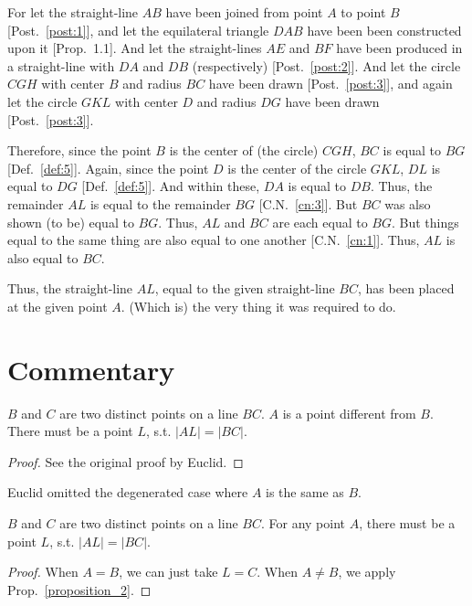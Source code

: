 For let the straight-line $AB$ have been joined from point $A$ to point $B$ [Post.~\ref{post:1}], and let the
equilateral triangle $DAB$ have been been constructed upon it [Prop.~1.1].  And let the
straight-lines $AE$ and $BF$ have been produced in a straight-line with $DA$ and $DB$  (respectively) [Post.~\ref{post:2}].
And let the circle $CGH$ with center $B$ and radius $BC$ have been drawn
[Post.~\ref{post:3}], and again let the circle $GKL$ with center $D$ and radius $DG$ have been drawn [Post.~\ref{post:3}].

Therefore, since the point $B$ is the center of (the circle) $CGH$, $BC$ is equal to 
$BG$ [Def.~\ref{def:5}]. Again, since the point $D$ is the center of the circle $GKL$, $DL$ is equal to $DG$ [Def.~\ref{def:5}]. And within these,  $DA$ is equal to $DB$. Thus, the remainder $AL$ is equal to the remainder $BG$ [C.N.~\ref{cn:3}]. But $BC$ was also shown (to be)  equal to $BG$. Thus,  $AL$
and $BC$ are each equal to $BG$. But things equal to the same thing are also equal to one another [C.N.~\ref{cn:1}]. Thus, $AL$ is also equal to $BC$.

Thus, the straight-line $AL$, equal to the given straight-line $BC$,
has been placed at the given point $A$. (Which is) the very thing it was required to do.

\section*{Commentary}

\begin{proposition}\label{proposition_2}\leanok
    $B$ and $C$ are two distinct points on a line $BC$. $A$ is a point different from $B$. There must be a point $L$, s.t. $|AL| = |BC|$.
\end{proposition}
\begin{proof}
    \leanok
    See the original proof by Euclid.
\end{proof}

Euclid omitted the degenerated case where $A$ is the same as $B$.

\begin{proposition}\label{proposition_2'}\leanok
    $B$ and $C$ are two distinct points on a line $BC$. For any point $A$, there must be a point $L$, s.t. $|AL| = |BC|$.
\end{proposition}
\begin{proof}
    \leanok
    When $A = B$, we can just take $L = C$.
    When $A \neq B$, we apply Prop.~\ref{proposition_2}.
\end{proof}

